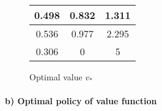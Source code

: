 \documentclass{article}
\begin{document}
\begin{figure}[H]
    \centering
        \begin{tabular}{c|c|c}
        0.498 & 0.832 & 1.311 \\ \hline
        0.536 & 0.977 & 2.295 \\ \hline                 
        0.306 & 0 & 5 \\
        \end{tabular}
        \caption{Optimal value $v_*$}
        \label{tab:table3}  
\end{figure}

\paragraph*{b) Optimal policy of value function}
\end{document}
